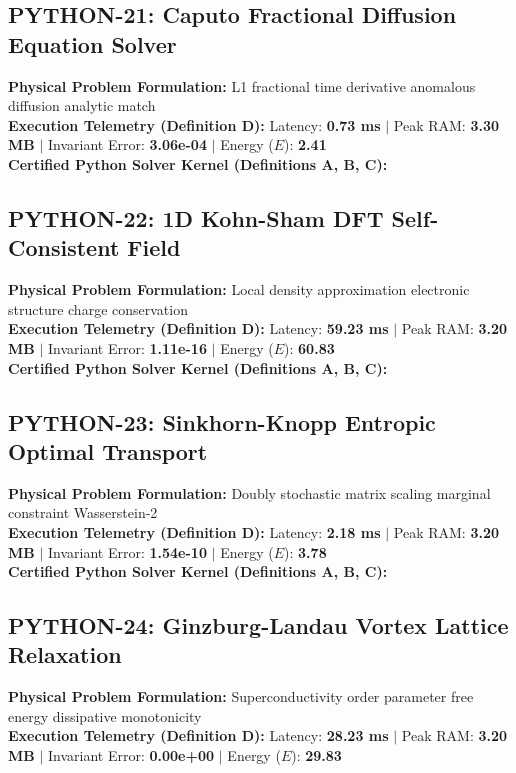 \vspace{1em}
\subsection{PYTHON-21: Caputo Fractional Diffusion Equation Solver}
\textbf{Physical Problem Formulation:} L1 fractional time derivative anomalous diffusion analytic match\\
\textbf{Execution Telemetry (Definition D):} Latency: \textbf{0.73 ms} $|$ Peak RAM: \textbf{3.30 MB} $|$ Invariant Error: \textbf{3.06e-04} $|$ Energy ($E$): \textbf{2.41}\\

\textbf{Certified Python Solver Kernel (Definitions A, B, C):}


\vspace{1em}
\subsection{PYTHON-22: 1D Kohn-Sham DFT Self-Consistent Field}
\textbf{Physical Problem Formulation:} Local density approximation electronic structure charge conservation\\
\textbf{Execution Telemetry (Definition D):} Latency: \textbf{59.23 ms} $|$ Peak RAM: \textbf{3.20 MB} $|$ Invariant Error: \textbf{1.11e-16} $|$ Energy ($E$): \textbf{60.83}\\

\textbf{Certified Python Solver Kernel (Definitions A, B, C):}


\vspace{1em}
\subsection{PYTHON-23: Sinkhorn-Knopp Entropic Optimal Transport}
\textbf{Physical Problem Formulation:} Doubly stochastic matrix scaling marginal constraint Wasserstein-2\\
\textbf{Execution Telemetry (Definition D):} Latency: \textbf{2.18 ms} $|$ Peak RAM: \textbf{3.20 MB} $|$ Invariant Error: \textbf{1.54e-10} $|$ Energy ($E$): \textbf{3.78}\\

\textbf{Certified Python Solver Kernel (Definitions A, B, C):}


\vspace{1em}
\subsection{PYTHON-24: Ginzburg-Landau Vortex Lattice Relaxation}
\textbf{Physical Problem Formulation:} Superconductivity order parameter free energy dissipative monotonicity\\
\textbf{Execution Telemetry (Definition D):} Latency: \textbf{28.23 ms} $|$ Peak RAM: \textbf{3.20 MB} $|$ Invariant Error: \textbf{0.00e+00} $|$ Energy ($E$): \textbf{29.83}\\

